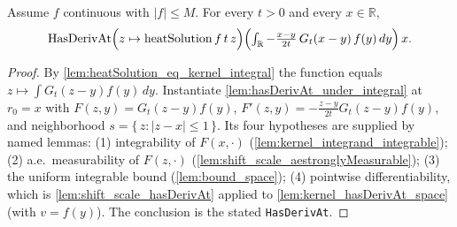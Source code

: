 \begin{lemma}
    \label{lem:hasDerivAt_space}
    \leanok
    Assume $f$ continuous with $\lvert f\rvert \le M$. For every $t > 0$ and every
    $x \in \mathbb{R}$,
    \[ \mathrm{HasDerivAt}\Bigl(z \mapsto \mathrm{heatSolution}\,f\,t\,z\Bigr)
       \Bigl(\textstyle\int_{\mathbb{R}} -\tfrac{x-y}{2t}\,G_t(x-y)\,f(y)\,dy\Bigr)\, x. \]
\end{lemma}
\begin{proof}
    By \cref{lem:heatSolution_eq_kernel_integral} the function equals
    $z \mapsto \int G_t(z-y) f(y)\, dy$. Instantiate
    \cref{lem:hasDerivAt_under_integral} at $r_0 = x$ with $F(z,y) = G_t(z-y) f(y)$,
    $F'(z,y) = -\tfrac{z-y}{2t} G_t(z-y) f(y)$, and neighborhood
    $s = \{\,z : \lvert z - x\rvert \le 1\,\}$. Its four hypotheses are supplied by
    named lemmas: (1) integrability of $F(x,\cdot)$
    (\cref{lem:kernel_integrand_integrable}); (2) a.e.\ measurability of $F(z,\cdot)$
    (\cref{lem:shift_scale_aestronglyMeasurable}); (3) the uniform integrable bound
    (\cref{lem:bound_space}); (4) pointwise differentiability, which is
    \cref{lem:shift_scale_hasDerivAt} applied to \cref{lem:kernel_hasDerivAt_space}
    (with $v = f(y)$). The conclusion is the stated \texttt{HasDerivAt}.
\end{proof}

